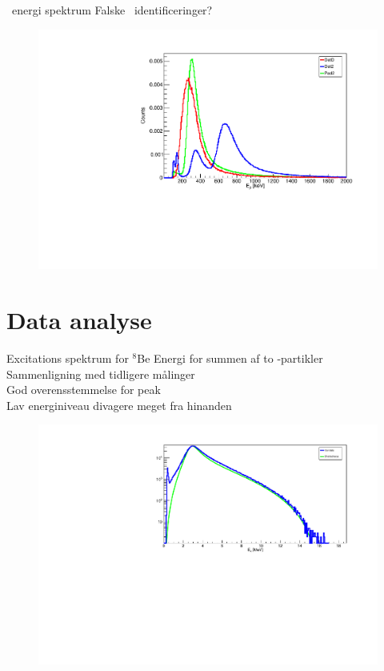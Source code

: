 \begin{frame}{\be\ energi spektrum}
	Falske \be\ identificeringer?
	\begin{figure}
		\includegraphics[width=.7\columnwidth]{../figures/betaSpec.pdf}
	\end{figure}
\end{frame}

\section{Data analyse}

\begin{frame}{Excitations spektrum for $^8$Be}
	Energi for summen af to \al-partikler\\
	Sammenligning med tidligere målinger \\
	God overensstemmelse for peak \\
	Lav energiniveau divagere meget fra hinanden
	\begin{figure}
		\includegraphics[width=.8\columnwidth]{../figures/bataraCompare.pdf}
	\end{figure}	
\end{frame}

